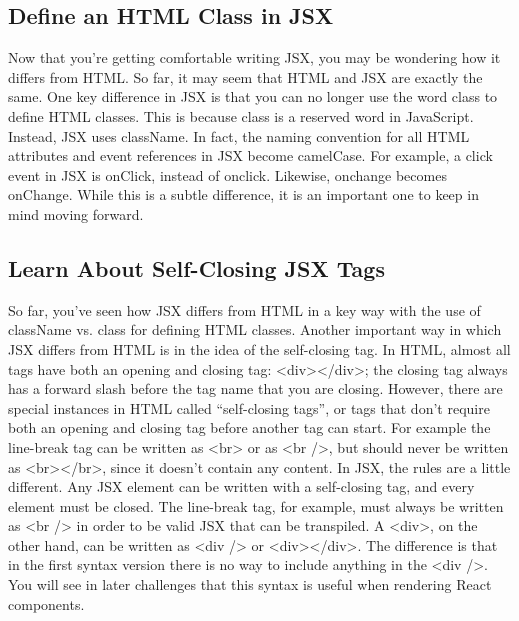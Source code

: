 \documentclass{article}%
\begin{document}
%
\subsection{Define an HTML Class in JSX}%
\label{subsec:DefineanHTMLClassinJSX}%
Now that you're getting comfortable writing JSX, you may be wondering how it differs from HTML.\newline%
So far, it may seem that HTML and JSX are exactly the same.\newline%
One key difference in JSX is that you can no longer use the word class to define HTML classes. This is because class is a reserved word in JavaScript. Instead, JSX uses className.\newline%
In fact, the naming convention for all HTML attributes and event references in JSX become camelCase. For example, a click event in JSX is onClick, instead of onclick. Likewise, onchange becomes onChange. While this is a subtle difference, it is an important one to keep in mind moving forward.\newline%

%
\subsection{Learn About Self{-}Closing JSX Tags}%
\label{subsec:LearnAboutSelf{-}ClosingJSXTags}%
So far, you’ve seen how JSX differs from HTML in a key way with the use of className vs. class for defining HTML classes.\newline%
Another important way in which JSX differs from HTML is in the idea of the self{-}closing tag.\newline%
In HTML, almost all tags have both an opening and closing tag: <div></div>; the closing tag always has a forward slash before the tag name that you are closing. However, there are special instances in HTML called “self{-}closing tags”, or tags that don’t require both an opening and closing tag before another tag can start.\newline%
For example the line{-}break tag can be written as <br> or as <br />, but should never be written as <br></br>, since it doesn't contain any content.\newline%
In JSX, the rules are a little different. Any JSX element can be written with a self{-}closing tag, and every element must be closed. The line{-}break tag, for example, must always be written as <br /> in order to be valid JSX that can be transpiled. A <div>, on the other hand, can be written as <div /> or <div></div>. The difference is that in the first syntax version there is no way to include anything in the <div />. You will see in later challenges that this syntax is useful when rendering React components.\newline%
\end{document}
